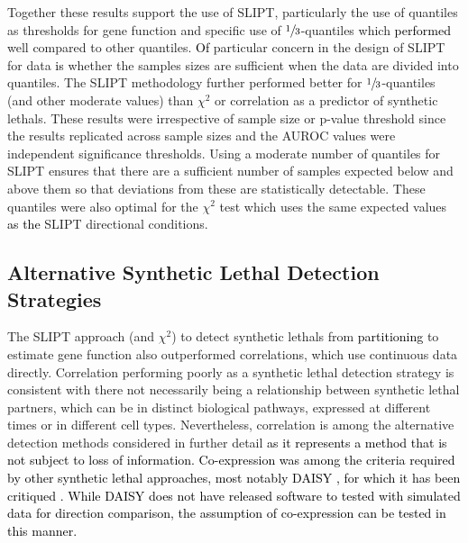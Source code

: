Together these results support the use of \gls{SLIPT}, particularly the use of quantiles as thresholds for gene function and specific use of $\sfrac{1}{3}$-quantiles which \textcolor{black}{performed} well compared to other quantiles. \textcolor{black}{Of} particular concern in the design of \gls{SLIPT} for  data \textcolor{black}{is} whether the  samples sizes are sufficient when the data are divided into quantiles. The \gls{SLIPT} methodology further performed better for $\sfrac{1}{3}$-quantiles (and other moderate values) than $\chi^2$ or correlation as a predictor of \glspl{synthetic lethal}. These results were irrespective of sample size or p-value threshold since the results replicated across sample sizes and the \gls{AUROC} values were independent significance thresholds. Using a moderate number of quantiles for \gls{SLIPT} ensures that there are a sufficient number of samples expected below and above them so that deviations from these are statistically detectable. These quantiles were also optimal for the $\chi^2$ test which uses the same expected values \textcolor{black}{as the} \gls{SLIPT} directional conditions.

\FloatBarrier

\subsection{Alternative Synthetic Lethal Detection Strategies}

The \gls{SLIPT} approach (and $\chi^2$) to detect \glspl{synthetic lethal} from \textcolor{black}{partitioning}  to estimate gene function also outperformed correlations, which use continuous data directly. Correlation performing poorly as a \gls{synthetic lethal} detection strategy is consistent with there not necessarily being a relationship between \gls{synthetic lethal} partners, which can be in distinct biological pathways, expressed at different times or in different cell types. Nevertheless, correlation is among the alternative detection methods considered in further detail \textcolor{black}{as it represents a method that is not subject to loss of information. Co-expression was among the criteria required by other synthetic lethal approaches, most notably \gls{DAISY} \citep{Jerby2014}, for which it has been critiqued \citep{Lu2015}. While DAISY does not have released software to tested with simulated data for direction comparison, the assumption of co-expression can be tested in this manner.}

